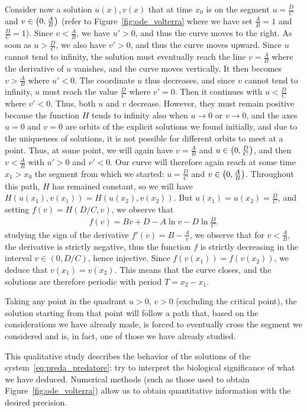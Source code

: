 Consider now a solution $u(x),v(x)$ that at time $x_0$ is on the segment
$u=\frac DC$ and $v\in \left(0,\frac A B\right)$ (refer to
Figure~\ref{fig:ode_volterra} where we have set $\frac AB=1$ and $\frac DC=1$).
Since $v<\frac A B$, we have $u'>0$, and thus the curve moves to the right. As
soon as $u>\frac DC$, we also have $v'>0$, and thus the curve moves upward.
Since $u$ cannot tend to infinity, the solution must eventually reach the line
$v=\frac AB$ where the derivative of $u$ vanishes, and the curve moves
vertically. It then becomes $v>\frac AB$ where $u'<0$. The coordinate $u$ thus
decreases, and since $v$ cannot tend to infinity, $u$ must reach the value
$\frac DC$ where $v'=0$. Then it continues with $u<\frac DC$ where $v'<0$. Thus,
both $u$ and $v$ decrease. However, they must remain positive because the
function $H$ tends to infinity also when $u\to 0$ or $v\to 0$, and the axes
$u=0$ and $v=0$ are orbits of the explicit solutions we found initially, and due
to the uniqueness of solutions, it is not possible for different orbits to meet
at a point. Thus, at some point, we will again have $v= \frac AB$ and $u\in
\left(0,\frac DC\right)$, and then $v<\frac AB$ with $u'>0$ and $v'<0$. Our
curve will therefore again reach at some time $x_1>x_0$ the segment from which
we started: $u=\frac DC$ and $v\in \left(0,\frac AB\right)$. Throughout this
path, $H$ has remained constant, so we will have
$H(u(x_1),v(x_1))=H(u(x_2),v(x_2))$. But $u(x_1)=u(x_2) = \frac DC$, and setting
$f(v) = H(D/C,v)$, we observe that
\begin{align*}
   f(v) = B v + D - A \ln v - D \ln \frac DC.
\end{align*}
studying the sign of the derivative $f'(v)=B-\frac{A}{v}$, we observe that for
$v<\frac AB$, the derivative is strictly negative, thus the function $f$ is
strictly decreasing in the interval $v\in(0,D/C)$, hence injective. Since
$f(v(x_1)) = f(v(x_2))$, we deduce that $v(x_1)=v(x_2)$. This means that the
curve closes, and the solutions are therefore periodic with period $T=x_2-x_1$.

Taking any point in the quadrant $u>0$, $v>0$ (excluding the critical point),
the solution starting from that point will follow a path that, based on the
considerations we have already made, is forced to eventually cross the segment
we considered and is, in fact, one of those we have already studied.

This qualitative study describes the behavior of the solutions of the
system~\ref{eq:preda_predatore}: try to interpret the biological significance of
what we have deduced. Numerical methods (such as those used to obtain
Figure~\ref{fig:ode_volterra}) allow us to obtain quantitative information with
the desired precision.

